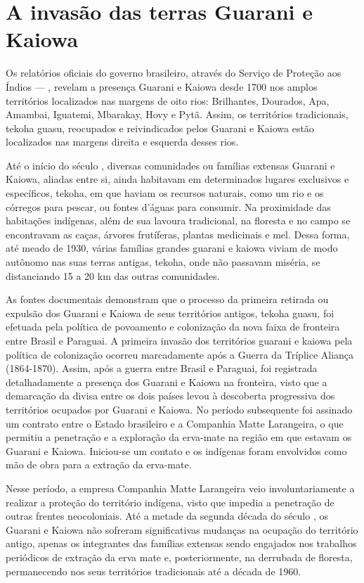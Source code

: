 \section{A invasão das terras Guarani e Kaiowa}

Os relatórios oficiais do governo brasileiro, através do Serviço de
Proteção aos Índios --- , revelam a presença Guarani e Kaiowa desde
1700 nos amplos territórios localizados nas margens de oito rios:
Brilhantes, Dourados, Apa, Amambai, Iguatemi, Mbarakay, Hovy e Pytã.
Assim, os territórios tradicionais, tekoha guasu, reocupados e
reivindicados pelos Guarani e Kaiowa estão localizados nas margens
direita e esquerda desses rios.

Até o início do século , diversas comunidades ou famílias extensas
Guarani e Kaiowa, aliadas entre si, ainda habitavam em determinados
lugares exclusivos e específicos, tekoha, em que haviam os recursos
naturais, como um rio e os córregos para pescar, ou fontes d’águas para
consumir. Na proximidade das habitações indígenas, além de sua lavoura
tradicional, na floresta e no campo se encontravam as caças, árvores
frutíferas, plantas medicinais e mel. Dessa forma, até meado de 1930,
várias famílias grandes guarani e kaiowa viviam de modo autônomo nas
suas terras antigas, tekoha, onde não passavam miséria, se distanciando
15 a 20 km das outras comunidades.

As fontes documentais demonstram que o processo da primeira retirada ou
expulsão dos Guarani e Kaiowa de seus territórios antigos, tekoha
guasu, foi efetuada pela política de povoamento e colonização da nova
faixa de fronteira entre Brasil e Paraguai. A primeira invasão dos
territórios guarani e kaiowa pela política de colonização ocorreu
marcadamente após a Guerra da Tríplice Aliança (1864-1870). Assim, após
a guerra entre Brasil e Paraguai, foi registrada detalhadamente a
presença dos Guarani e Kaiowa na fronteira, visto que a demarcação da
divisa entre os dois países levou à descoberta progressiva dos
territórios ocupados por Guarani e Kaiowa. No período subsequente foi
assinado um contrato entre o Estado brasileiro e a Companhia Matte
Larangeira, o que permitiu a penetração e a exploração da erva-mate na
região em que estavam os Guarani e Kaiowa. Iniciou-se um contato e os
indígenas foram envolvidos como mão de obra para a extração da
erva-mate.

Nesse período, a empresa Companhia Matte Larangeira veio
involuntariamente a realizar a proteção do território indígena, visto
que impedia a penetração de outras frentes neocoloniais. Até a metade
da segunda década do século , os Guarani e Kaiowa não sofreram
significativas mudanças na ocupação do território antigo, apenas os
integrantes das famílias extensas sendo engajados nos trabalhos
periódicos de extração da erva mate e, posteriormente, na derrubada de
floresta, permanecendo nos seus territórios tradicionais até a década
de 1960.

